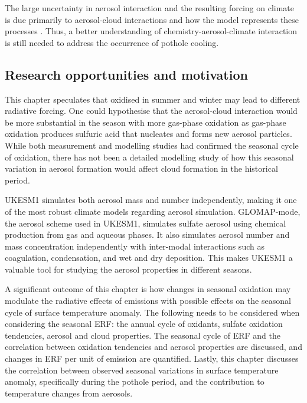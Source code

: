 The large uncertainty in aerosol interaction and the resulting forcing on climate is due primarily to aerosol-cloud interactions and how the model represents these processes \citep{carslawLargeContributionNatural2013,ghanChallengesConstrainingAnthropogenic2016}. Thus, a better understanding of chemistry-aerosol-climate interaction is still needed to address the occurrence of pothole cooling.


\subsection{Research opportunities and motivation}

This chapter speculates that  oxidised in summer and winter may lead to different radiative forcing. One could hypothesise that the aerosol-cloud interaction would be more substantial in the season with more gas-phase oxidation as gas-phase oxidation produces sulfuric acid that nucleates and forms new aerosol particles. While both measurement and modelling studies had confirmed the seasonal cycle of  oxidation, there has not been a detailed modelling study of how this seasonal variation in aerosol formation would affect cloud formation in the historical period. 

UKESM1 simulates both aerosol mass and number independently, making it one of the most robust climate models regarding aerosol simulation. GLOMAP-mode, the aerosol scheme used in UKESM1, simulates sulfate aerosol using chemical production from gas and aqueous phases. It also simulates aerosol number and mass concentration independently with inter-modal interactions such as coagulation, condensation, and wet and dry deposition. This makes UKESM1 a valuable tool for studying the aerosol properties in different seasons.

A significant outcome of this chapter is how changes in seasonal oxidation may modulate the radiative effects of  emissions with possible effects on the seasonal cycle of surface temperature anomaly. The following needs to be considered when considering the seasonal ERF: the annual cycle of oxidants, sulfate oxidation tendencies, aerosol and cloud properties. The seasonal cycle of ERF and the correlation between oxidation tendencies and aerosol properties are discussed, and changes in ERF per unit of  emission are quantified. Lastly, this chapter discusses the correlation between observed seasonal variations in surface temperature anomaly, specifically during the pothole period, and the contribution to temperature changes from aerosols.


